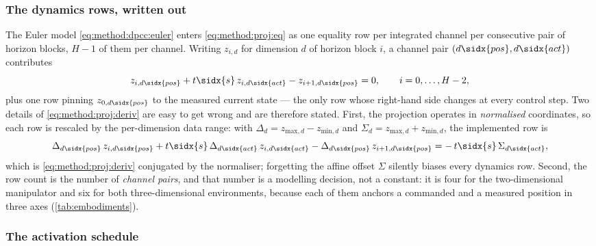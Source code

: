 \subsubsection*{The dynamics rows, written out}

The Euler model \eqref{eq:method:dpcc:euler} enters \eqref{eq:method:proj:eq} as one equality row per
integrated channel per consecutive pair of horizon blocks, $H-1$ of them per channel. Writing $z_{i,d}$ for dimension $d$ of horizon block $i$, a
channel pair $(d\sidx{pos},d\sidx{act})$ contributes
\begin{equation}\label{eq:method:proj:deriv}
  z_{i,d\sidx{pos}} + t\sidx{s}\,z_{i,d\sidx{act}} - z_{i+1,d\sidx{pos}} = 0,
  \qquad i = 0,\dots,H-2,
\end{equation}
plus one row pinning $z_{0,d\sidx{pos}}$ to the measured current state --- the only row whose
right-hand side changes at every control step. Two details of \eqref{eq:method:proj:deriv} are easy
to get wrong and are therefore stated. First, the projection operates in \emph{normalised}
coordinates, so each row is rescaled by the per-dimension data range: with
$\Delta_{d} = z_{\textrm{max},d} - z_{\textrm{min},d}$ and
$\Sigma_{d} = z_{\textrm{max},d} + z_{\textrm{min},d}$, the implemented row is
\begin{equation}\label{eq:method:proj:derivnorm}
  \Delta_{d\sidx{pos}}\,z_{i,d\sidx{pos}}
  + t\sidx{s}\,\Delta_{d\sidx{act}}\,z_{i,d\sidx{act}}
  - \Delta_{d\sidx{pos}}\,z_{i+1,d\sidx{pos}}
  = -\,t\sidx{s}\,\Sigma_{d\sidx{act}} ,
\end{equation}
which is \eqref{eq:method:proj:deriv} conjugated by the normaliser; forgetting the affine offset
$\Sigma$ silently biases every dynamics row. Second, the row count is the number of
\emph{channel pairs}, and that number is a modelling decision, not a constant: it is four for the
two-dimensional manipulator and six for both three-dimensional environments, because each of them
anchors a commanded and a measured position in three axes
(\autoref{tab:embodiments}).

\subsubsection*{The activation schedule}

